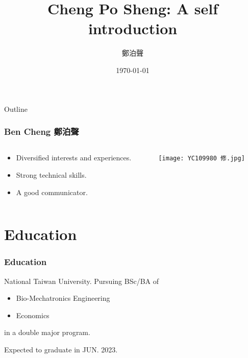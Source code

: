 \documentclass[compress]{beamer}
\title{Cheng Po Sheng: A self introduction}
\author{鄭泊聲}
\institute{}
\date{\today}
\begin{document}
\begin{frame}
    \titlepage
\end{frame}

\begin{frame}[allowframebreaks]{Outline}
    \tableofcontents
\end{frame}

\begin{frame}
    \frametitle{Ben Cheng 鄭泊聲}
    \begin{columns}
        \begin{column}{0.5\linewidth}
            \begin{itemize}
                \item Diversified interests and experiences.
                \item Strong technical skills.
                \item A good communicator.
            \end{itemize}
        \end{column}
        \begin{column}{0.5\linewidth}
            \texttt{[image: YC109980 修.jpg]}
        \end{column}
    \end{columns}
\end{frame}

\section{Education}
\begin{frame}
    \frametitle{Education}
    National Taiwan University. Pursuing BSc/BA of
    \begin{itemize}
        \item Bio-Mechatronics Engineering
        \item Economics
    \end{itemize}
    in a double major program.

    Expected to graduate in JUN. 2023.
\end{frame}
\end{document}
